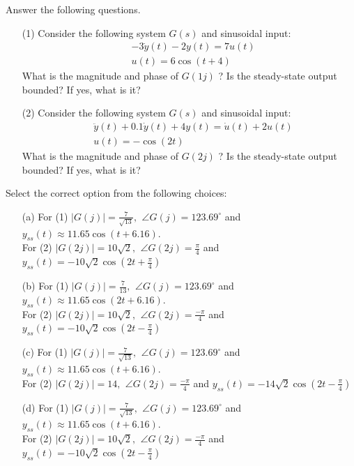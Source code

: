 \documentclass[12pt]{article}
\begin{document}
Answer the following questions.
\begin{itemize}
    \item [(1)] Consider the following system $G(s)$ and sinusoidal input:
        \begin{align*}
        & -3 \dot{y}(t)-2 y(t)=7 u(t) \\
        & u(t)=6 \cos (t+4)
        \end{align*}
    What is the magnitude and phase of $G(1 j)$ ? Is the steady-state output bounded? If yes, what is it?
    \item[(2)] Consider the following system $G(s)$ and sinusoidal input:
        \begin{align*}
        & \ddot{y}(t)+0.1 \dot{y}(t)+4 y(t)=\dot{u}(t)+2 u(t) \\
        & u(t)=-\cos (2 t)
        \end{align*}
    What is the magnitude and phase of $G(2 j)$ ? Is the steady-state output bounded? If yes, what is it?
\end{itemize}
Select the correct option from the following choices:
\begin{enumerate}
    \item [(a)] For (1) $|G(j)|=\frac{7 }{\sqrt{13}}, \,\ \angle G(j)=123.69^{\circ}$ and \(y_{s s}(t) \approx 11.65 \cos (t+6.16)\). \\
    For (2)  $|G(2j)| = 10 \sqrt{2}, \,\ \angle G(2j) = \frac{\pi}{4}$ and \(y_{ss}(t)=-10\sqrt{2}\cos{\left( 2 t +\frac{\pi}{4} \right)}\)
    
    \item [(b)]For (1) $|G(j)|=\frac{7 }{13}, \,\ \angle G(j)=123.69^{\circ}$ and \(y_{s s}(t) \approx 11.65 \cos (2 t+6.16)\). \\
    For (2)  $|G(2j)| = 10 \sqrt{2}, \,\ \angle G(2j) = \frac{-\pi}{4}$ and \(y_{ss}(t)=-10\sqrt{2}\cos{\left( 2 t -\frac{\pi}{4} \right)}\)
    
    \item [(c)] For (1) $|G(j)|=\frac{7 }{\sqrt{13}}, \,\ \angle G(j)=123.69^{\circ}$ and \(y_{s s}(t) \approx 11.65 \cos (t+6.16)\). \\
    For (2)  $|G(2j)| = 14, \,\ \angle G(2j) = \frac{-\pi}{4}$ and \(y_{ss}(t)=-14\sqrt{2}\cos{\left( 2 t -\frac{\pi}{4} \right)}\)
    
    \item [(d)] For (1) $|G(j)|=\frac{7 }{\sqrt{13}}, \,\ \angle G(j)=123.69^{\circ}$ and \(y_{s s}(t) \approx 11.65 \cos (t+6.16)\). \\
    For (2)  $|G(2j)| = 10 \sqrt{2}, \,\ \angle G(2j) = \frac{-\pi}{4}$ and \(y_{ss}(t)=-10\sqrt{2}\cos{\left( 2 t -\frac{\pi}{4} \right)}\)
\end{enumerate}
\end{document}
